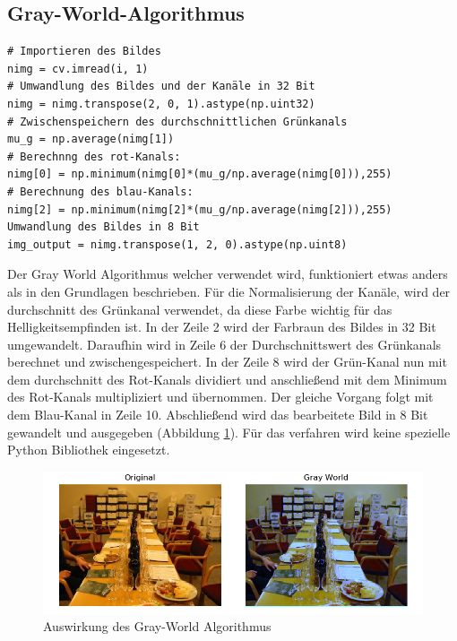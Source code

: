 \subsection{Gray-World-Algorithmus} %
\begin{lstlisting}
# Importieren des Bildes
nimg = cv.imread(i, 1)
# Umwandlung des Bildes und der Kanäle in 32 Bit
nimg = nimg.transpose(2, 0, 1).astype(np.uint32)
# Zwischenspeichern des durchschnittlichen Grünkanals
mu_g = np.average(nimg[1])
# Berechnng des rot-Kanals: 
nimg[0] = np.minimum(nimg[0]*(mu_g/np.average(nimg[0])),255)
# Berechnung des blau-Kanals:
nimg[2] = np.minimum(nimg[2]*(mu_g/np.average(nimg[2])),255)
Umwandlung des Bildes in 8 Bit
img_output = nimg.transpose(1, 2, 0).astype(np.uint8)
\end{lstlisting}
Der Gray World Algorithmus \cite{gray2012world} welcher verwendet wird, funktioniert etwas anders als in den Grundlagen beschrieben. Für die Normalisierung der Kanäle, wird der durchschnitt des Grünkanal verwendet, da diese Farbe wichtig für das Helligkeitsempfinden ist. %
In der Zeile 2 wird der Farbraun des Bildes in 32 Bit umgewandelt. Daraufhin wird in Zeile 6 der Durchschnittswert des Grünkanals berechnet und zwischengespeichert. In der Zeile 8 wird der Grün-Kanal nun mit dem durchschnitt des Rot-Kanals dividiert und anschließend mit dem Minimum des Rot-Kanals multipliziert und übernommen. Der gleiche Vorgang folgt mit dem Blau-Kanal in Zeile 10. Abschließend wird das bearbeitete Bild in 8 Bit gewandelt und ausgegeben (Abbildung \ref{img:gwnimg}). Für das verfahren wird keine spezielle Python Bibliothek eingesetzt. %
\begin{figure}
	[h]
	\centering
	\includegraphics[scale=0.6]{Sources/gwn.png}
	\caption{Auswirkung des Gray-World Algorithmus}
	\label{img:gwnimg}
\end{figure}
